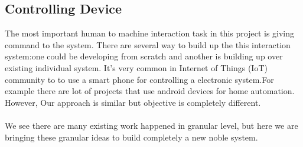 \subsection{Controlling Device}
The most important human to machine interaction task in this project is giving command to the system. There are several way to build up the this interaction system:one could be developing from scratch and another is building up over existing individual system. It's very common in Internet of Things (IoT) community to to use a smart phone for controlling a electronic system.For example there are lot of projects that use android devices for home automation. However, Our approach is similar but objective is completely different.
\\
\\
We see there are many existing work happened in granular level, but here we are bringing these granular ideas to build completely a new noble system.
